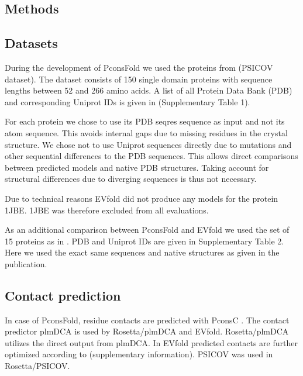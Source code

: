 \documentclass{bioinfo}
\begin{document}
\begin{methods}
\section{Methods}

\subsection{Datasets}
During the development of PconsFold we used the proteins from
\citeauthor{jones_psicov:_2012} \citeyear{jones_psicov:_2012} (PSICOV
dataset). The dataset consists of 150 single domain proteins with sequence
lengths between 52 and 266 amino acids. A list of all Protein Data
Bank (PDB) \cite[]{berman_protein_2000} and corresponding Uniprot
\cite[]{magrane_uniprot_2011} IDs is given in (Supplementary Table
1). 


For each protein we chose to use its PDB seqres sequence as input and
not its atom sequence. This avoids internal gaps due to missing
residues in the crystal structure. We chose not to use Uniprot
sequences directly due to mutations and other sequential differences
to the PDB sequences. This allows direct comparisons between predicted
models and native PDB structures. Taking account for structural
differences due to diverging sequences is thus not necessary. 

Due to technical reasons EVfold did not produce any models for the
protein 1JBE. 1JBE was therefore excluded from all evaluations.


As an additional comparison between PconsFold and EVfold we used the set
of 15 proteins as in \citeauthor{marks_protein_2011}
\citeyear{marks_protein_2011}. PDB and Uniprot IDs are given in
Supplementary Table 2. Here we used the exact same sequences and
native structures as given in the publication.  

\subsection{Contact prediction}
In case of PconsFold, residue contacts are predicted with PconsC
\cite[]{skwark_PconsC:_2013}. The contact predictor plmDCA
\cite[]{ekeberg_improved_2013} is used by Rosetta/plmDCA and
EVfold. Rosetta/plmDCA utilizes the direct output from plmDCA. In
EVfold predicted contacts are further optimized according to
\citeauthor{marks_protein_2011} \citeyear{marks_protein_2011}
(supplementary information). PSICOV was used in Rosetta/PSICOV. 



\end{methods}
\end{document}
